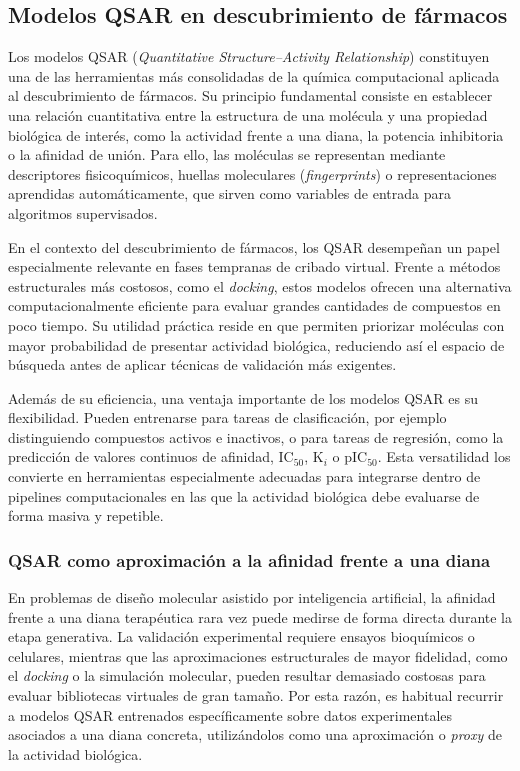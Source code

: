 \documentclass[IB]{TFUOC}%
\begin{document}
\subsection{Modelos QSAR en descubrimiento de fármacos}

Los modelos QSAR (\textit{Quantitative Structure--Activity Relationship}) constituyen una de las herramientas más consolidadas de la química computacional aplicada al descubrimiento de fármacos. Su principio fundamental consiste en establecer una relación cuantitativa entre la estructura de una molécula y una propiedad biológica de interés, como la actividad frente a una diana, la potencia inhibitoria o la afinidad de unión. Para ello, las moléculas se representan mediante descriptores fisicoquímicos, huellas moleculares (\textit{fingerprints}) o representaciones aprendidas automáticamente, que sirven como variables de entrada para algoritmos supervisados.

En el contexto del descubrimiento de fármacos, los QSAR desempeñan un papel especialmente relevante en fases tempranas de cribado virtual. Frente a métodos estructurales más costosos, como el \textit{docking}, estos modelos ofrecen una alternativa computacionalmente eficiente para evaluar grandes cantidades de compuestos en poco tiempo. Su utilidad práctica reside en que permiten priorizar moléculas con mayor probabilidad de presentar actividad biológica, reduciendo así el espacio de búsqueda antes de aplicar técnicas de validación más exigentes.

Además de su eficiencia, una ventaja importante de los modelos QSAR es su flexibilidad. Pueden entrenarse para tareas de clasificación, por ejemplo distinguiendo compuestos activos e inactivos, o para tareas de regresión, como la predicción de valores continuos de afinidad, IC$_{50}$, K$_i$ o pIC$_{50}$. Esta versatilidad los convierte en herramientas especialmente adecuadas para integrarse dentro de pipelines computacionales en las que la actividad biológica debe evaluarse de forma masiva y repetible.

\subsubsection{QSAR como aproximación a la afinidad frente a una diana}

En problemas de diseño molecular asistido por inteligencia artificial, la afinidad frente a una diana terapéutica rara vez puede medirse de forma directa durante la etapa generativa. La validación experimental requiere ensayos bioquímicos o celulares, mientras que las aproximaciones estructurales de mayor fidelidad, como el \textit{docking} o la simulación molecular, pueden resultar demasiado costosas para evaluar bibliotecas virtuales de gran tamaño. Por esta razón, es habitual recurrir a modelos QSAR entrenados específicamente sobre datos experimentales asociados a una diana concreta, utilizándolos como una aproximación o \textit{proxy} de la actividad biológica.
\end{document}
